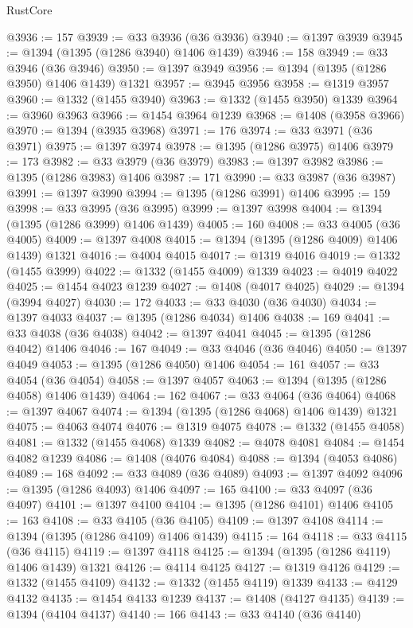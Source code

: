 \begin{lexlean}{RustCore}
\begin{coremodule}
@3936 := 157
@3939 := @33 @3936 (@36 @3936)
@3940 := @1397 @3939
@3945 := @1394 (@1395 (@1286 @3940) @1406 @1439)
@3946 := 158
@3949 := @33 @3946 (@36 @3946)
@3950 := @1397 @3949
@3956 := @1394 (@1395 (@1286 @3950) @1406 @1439) @1321
@3957 := @3945 @3956
@3958 := @1319 @3957
@3960 := @1332 (@1455 @3940)
@3963 := @1332 (@1455 @3950) @1339
@3964 := @3960 @3963
@3966 := @1454 @3964 @1239
@3968 := @1408 (@3958 @3966)
@3970 := @1394 (@3935 @3968)
@3971 := 176
@3974 := @33 @3971 (@36 @3971)
@3975 := @1397 @3974
@3978 := @1395 (@1286 @3975) @1406
@3979 := 173
@3982 := @33 @3979 (@36 @3979)
@3983 := @1397 @3982
@3986 := @1395 (@1286 @3983) @1406
@3987 := 171
@3990 := @33 @3987 (@36 @3987)
@3991 := @1397 @3990
@3994 := @1395 (@1286 @3991) @1406
@3995 := 159
@3998 := @33 @3995 (@36 @3995)
@3999 := @1397 @3998
@4004 := @1394 (@1395 (@1286 @3999) @1406 @1439)
@4005 := 160
@4008 := @33 @4005 (@36 @4005)
@4009 := @1397 @4008
@4015 := @1394 (@1395 (@1286 @4009) @1406 @1439) @1321
@4016 := @4004 @4015
@4017 := @1319 @4016
@4019 := @1332 (@1455 @3999)
@4022 := @1332 (@1455 @4009) @1339
@4023 := @4019 @4022
@4025 := @1454 @4023 @1239
@4027 := @1408 (@4017 @4025)
@4029 := @1394 (@3994 @4027)
@4030 := 172
@4033 := @33 @4030 (@36 @4030)
@4034 := @1397 @4033
@4037 := @1395 (@1286 @4034) @1406
@4038 := 169
@4041 := @33 @4038 (@36 @4038)
@4042 := @1397 @4041
@4045 := @1395 (@1286 @4042) @1406
@4046 := 167
@4049 := @33 @4046 (@36 @4046)
@4050 := @1397 @4049
@4053 := @1395 (@1286 @4050) @1406
@4054 := 161
@4057 := @33 @4054 (@36 @4054)
@4058 := @1397 @4057
@4063 := @1394 (@1395 (@1286 @4058) @1406 @1439)
@4064 := 162
@4067 := @33 @4064 (@36 @4064)
@4068 := @1397 @4067
@4074 := @1394 (@1395 (@1286 @4068) @1406 @1439) @1321
@4075 := @4063 @4074
@4076 := @1319 @4075
@4078 := @1332 (@1455 @4058)
@4081 := @1332 (@1455 @4068) @1339
@4082 := @4078 @4081
@4084 := @1454 @4082 @1239
@4086 := @1408 (@4076 @4084)
@4088 := @1394 (@4053 @4086)
@4089 := 168
@4092 := @33 @4089 (@36 @4089)
@4093 := @1397 @4092
@4096 := @1395 (@1286 @4093) @1406
@4097 := 165
@4100 := @33 @4097 (@36 @4097)
@4101 := @1397 @4100
@4104 := @1395 (@1286 @4101) @1406
@4105 := 163
@4108 := @33 @4105 (@36 @4105)
@4109 := @1397 @4108
@4114 := @1394 (@1395 (@1286 @4109) @1406 @1439)
@4115 := 164
@4118 := @33 @4115 (@36 @4115)
@4119 := @1397 @4118
@4125 := @1394 (@1395 (@1286 @4119) @1406 @1439) @1321
@4126 := @4114 @4125
@4127 := @1319 @4126
@4129 := @1332 (@1455 @4109)
@4132 := @1332 (@1455 @4119) @1339
@4133 := @4129 @4132
@4135 := @1454 @4133 @1239
@4137 := @1408 (@4127 @4135)
@4139 := @1394 (@4104 @4137)
@4140 := 166
@4143 := @33 @4140 (@36 @4140)

\end{coremodule}
\end{lexlean}
